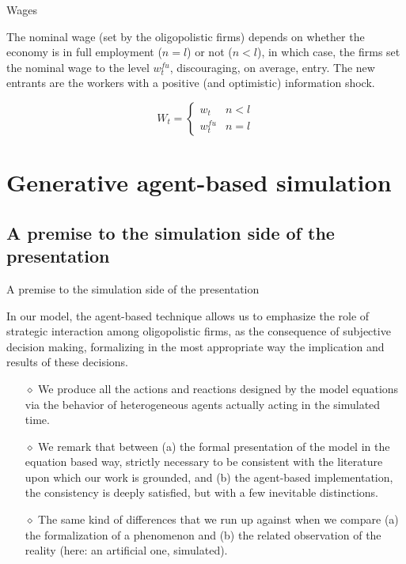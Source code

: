 \documentclass[9pt]{beamer}
\begin{document}
\begin{frame}{Wages}

The nominal wage (set by the oligopolistic firms) depends on whether the economy is in full employment ($n=l$) or not ($n<l$), in which case, the firms set the nominal wage to the level $w_{t}^{fu}$, discouraging, on average, entry. The new entrants are the workers with a positive (and optimistic) information shock.

\begin{equation}
W_{t}=
\begin{cases}
w_{t} & n<l \\
w_{t}^{fu} & n=l
\end{cases}
\label{wage general determination}
\end{equation}

\end{frame}

\section{Generative agent-based simulation}

\subsection{A premise to the simulation side of the presentation}

\begin{frame}{A premise to the simulation side of the presentation}

In our model, the agent-based technique allows us to emphasize the role of strategic interaction among oligopolistic firms, as the consequence of subjective decision making, formalizing in the most appropriate way the implication and results of these decisions. 

\begin{itemize}

\item[$\diamond$] We produce all the actions and reactions designed by the model equations via the behavior of heterogeneous agents actually acting in the simulated time. 

\item[$\diamond$] We remark that between (a) the formal presentation of the model in the equation based way, strictly necessary to be consistent with the literature upon which our work is grounded, and (b) the agent-based implementation, the consistency is deeply satisfied, but with a few inevitable distinctions. 

\item[$\diamond$] The same kind of differences that we run up against when we compare (a) the formalization of a phenomenon and (b) the related observation of the reality (here: an artificial one, simulated).

\end{itemize}

\end{frame}
\end{document}
